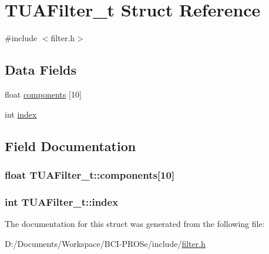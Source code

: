 \hypertarget{struct_t_u_a_filter__t}{}\section{T\+U\+A\+Filter\+\_\+t Struct Reference}
\label{struct_t_u_a_filter__t}


{\ttfamily \#include $<$filter.\+h$>$}

\subsection*{Data Fields}
\begin{DoxyCompactItemize}
\item 
float \hyperlink{struct_t_u_a_filter__t_a4e86eb38d828381304bd3d32f54fa13a}{components} \mbox{[}10\mbox{]}
\item 
int \hyperlink{struct_t_u_a_filter__t_adc604654407662b72b75faa89cd9d2f8}{index}
\end{DoxyCompactItemize}


\subsection{Field Documentation}
\subsubsection[{\texorpdfstring{components}{components}}]{\setlength{\rightskip}{0pt plus 5cm}float T\+U\+A\+Filter\+\_\+t\+::components\mbox{[}10\mbox{]}}\hypertarget{struct_t_u_a_filter__t_a4e86eb38d828381304bd3d32f54fa13a}{}\label{struct_t_u_a_filter__t_a4e86eb38d828381304bd3d32f54fa13a}
\subsubsection[{\texorpdfstring{index}{index}}]{\setlength{\rightskip}{0pt plus 5cm}int T\+U\+A\+Filter\+\_\+t\+::index}\hypertarget{struct_t_u_a_filter__t_adc604654407662b72b75faa89cd9d2f8}{}\label{struct_t_u_a_filter__t_adc604654407662b72b75faa89cd9d2f8}


The documentation for this struct was generated from the following file\+:\begin{DoxyCompactItemize}
\item 
D\+:/\+Documents/\+Workspace/\+B\+C\+I-\/\+P\+R\+O\+Se/include/\hyperlink{filter_8h}{filter.\+h}\end{DoxyCompactItemize}

